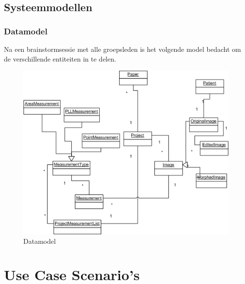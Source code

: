 \subsection{Systeemmodellen}
\subsubsection{Datamodel}
Na een brainstormsessie met alle groepsleden is het volgende model bedacht om de verschillende entiteiten in te delen.
\begin{figure}[htp]
\begin{center}
	\includegraphics[scale=0.65]{brainstorm_klassediagram}
\caption{Datamodel}
\label{default}
\end{center}
\end{figure}


\section{Use Case Scenario's}

